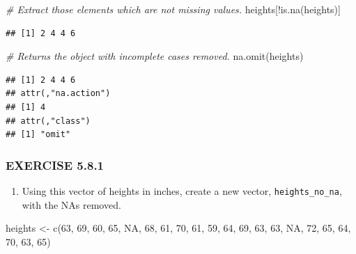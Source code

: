 \documentclass[
]{book}
\newenvironment{Shaded}{\begin{snugshade}}{\end{snugshade}}
\newcommand{\CommentTok}[1]{\textcolor[rgb]{0.56,0.35,0.01}{\textit{#1}}}
\newcommand{\ConstantTok}[1]{\textcolor[rgb]{0.00,0.00,0.00}{#1}}
\newcommand{\DecValTok}[1]{\textcolor[rgb]{0.00,0.00,0.81}{#1}}
\newcommand{\FunctionTok}[1]{\textcolor[rgb]{0.00,0.00,0.00}{#1}}
\newcommand{\NormalTok}[1]{#1}
\newcommand{\OtherTok}[1]{\textcolor[rgb]{0.56,0.35,0.01}{#1}}
\newcommand{\SpecialCharTok}[1]{\textcolor[rgb]{0.00,0.00,0.00}{#1}}
\providecommand{\tightlist}{%
  \setlength{\itemsep}{0pt}\setlength{\parskip}{0pt}}
\begin{document}
\begin{Shaded}
\begin{Highlighting}[]
\CommentTok{\# Extract those elements which are not missing values.}
\NormalTok{heights[}\SpecialCharTok{!}\FunctionTok{is.na}\NormalTok{(heights)]}
\end{Highlighting}
\end{Shaded}

\begin{verbatim}
## [1] 2 4 4 6
\end{verbatim}

\begin{Shaded}
\begin{Highlighting}[]
\CommentTok{\# Returns the object with incomplete cases removed.}
\FunctionTok{na.omit}\NormalTok{(heights)}
\end{Highlighting}
\end{Shaded}

\begin{verbatim}
## [1] 2 4 4 6
## attr(,"na.action")
## [1] 4
## attr(,"class")
## [1] "omit"
\end{verbatim}

\hypertarget{exercise-5.8.1}{%
\subsubsection*{EXERCISE 5.8.1}\label{exercise-5.8.1}}

\begin{enumerate}
\def\labelenumi{\arabic{enumi}.}
\tightlist
\item
  Using this vector of heights in inches, create a new vector, \texttt{heights\_no\_na}, with the NAs removed.
\end{enumerate}

\begin{Shaded}
\begin{Highlighting}[]
\NormalTok{heights }\OtherTok{\textless{}{-}} \FunctionTok{c}\NormalTok{(}\DecValTok{63}\NormalTok{, }\DecValTok{69}\NormalTok{, }\DecValTok{60}\NormalTok{, }\DecValTok{65}\NormalTok{, }\ConstantTok{NA}\NormalTok{, }\DecValTok{68}\NormalTok{, }\DecValTok{61}\NormalTok{, }\DecValTok{70}\NormalTok{, }\DecValTok{61}\NormalTok{, }\DecValTok{59}\NormalTok{, }\DecValTok{64}\NormalTok{, }\DecValTok{69}\NormalTok{, }\DecValTok{63}\NormalTok{, }\DecValTok{63}\NormalTok{, }\ConstantTok{NA}\NormalTok{, }\DecValTok{72}\NormalTok{, }\DecValTok{65}\NormalTok{, }\DecValTok{64}\NormalTok{, }\DecValTok{70}\NormalTok{, }\DecValTok{63}\NormalTok{, }\DecValTok{65}\NormalTok{)}
\end{Highlighting}
\end{Shaded}
\end{document}
